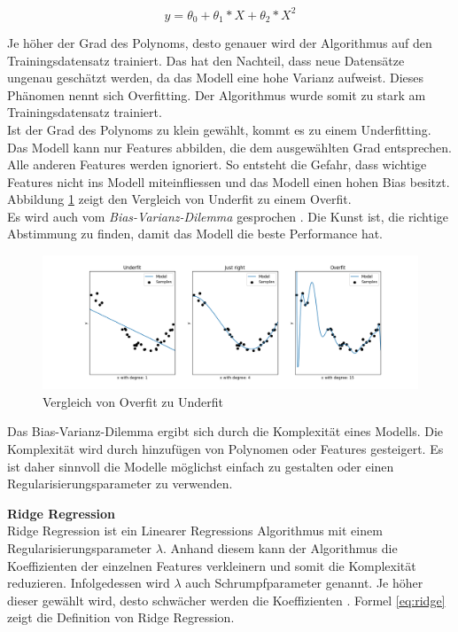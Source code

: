 \begin{equation}
\label{eq:poly}
y = \theta_0 + \theta_1 * X + \theta_2 * X^2
\end{equation}

Je höher der Grad des Polynoms, desto genauer wird der Algorithmus auf den Trainingsdatensatz trainiert. Das hat den Nachteil, dass neue Datensätze ungenau geschätzt werden, da das Modell eine hohe Varianz aufweist. Dieses Phänomen nennt sich Overfitting. Der Algorithmus wurde somit zu stark am Trainingsdatensatz trainiert.\\
Ist der Grad des Polynoms zu klein gewählt, kommt es zu einem Underfitting. Das Modell kann nur Features abbilden, die dem ausgewählten Grad entsprechen. Alle anderen Features werden ignoriert. So entsteht die Gefahr, dass wichtige Features nicht ins Modell miteinfliessen und das Modell einen hohen Bias besitzt. Abbildung \ref{fig:under_overfit} zeigt den Vergleich von Underfit zu einem Overfit.\\
Es wird auch vom \textit{Bias-Varianz-Dilemma} gesprochen \cite{bias_variance, bias_variance_2}. Die Kunst ist, die richtige Abstimmung zu finden, damit das Modell die beste Performance hat.

\begin{figure}[ht]\label{fig:under_overfit}
\centering
\includegraphics[width=\textwidth]{images/overfit_underfit.png}
\caption[Vergleich von Overfit zu Underfit]{Vergleich von Overfit zu Underfit}
\end{figure}

Das Bias-Varianz-Dilemma ergibt sich durch die Komplexität eines Modells. Die Komplexität wird durch hinzufügen von Polynomen oder Features gesteigert.
Es ist daher sinnvoll die Modelle möglichst einfach zu gestalten oder einen Regularisierungsparameter zu verwenden.

\textbf{Ridge Regression}\\
Ridge Regression ist ein Linearer Regressions Algorithmus mit einem Regularisierungsparameter $\lambda$. Anhand diesem kann der Algorithmus die Koeffizienten der einzelnen Features verkleinern und somit die Komplexität reduzieren. Infolgedessen wird $\lambda$ auch Schrumpfparameter genannt. Je höher dieser gewählt wird, desto schwächer werden die Koeffizienten \cite{ridge, ridge_2}. Formel \eqref{eq:ridge} zeigt die Definition von Ridge Regression.

